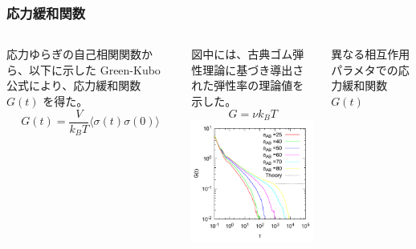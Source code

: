 \documentclass[12pt, dvipdfmx]{beamer}
\begin{document}
\begin{frame}
\frametitle{応力緩和関数}

	\begin{columns}[T, totalwidth=\linewidth]
	応力ゆらぎの自己相関関数から、以下に示した Green-Kubo 公式により、応力緩和関数 $G(t)$ を得た。
	\begin{equation*}
	G(t) = \dfrac{V}{k_B T} \langle \sigma(t) \sigma(0) \rangle
	\end{equation*}

	図中には、古典ゴム弾性理論に基づき導出された弾性率の理論値を示した。
	\begin{equation*}
	G=\nu k_B T
	\end{equation*}
	\includegraphics[width=\columnwidth]{./fig/gt_all.pdf}

	異なる相互作用パラメタでの応力緩和関数 $G(t)$
	\end{columns}
\end{frame}
\end{document}
